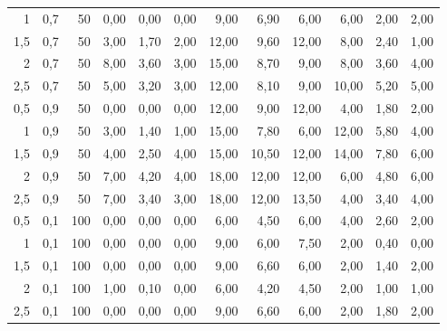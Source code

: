 \begin{table}[h]
\begin{tabular}{|r|r|r|r|r|r|r|r|r|r|r|r|}
1 & 0,7 & 50 & 0,00 & 0,00 & 0,00 & 9,00 & 6,90 & 6,00 & 6,00 & 2,00 & 2,00 \\
1,5 & 0,7 & 50 & 3,00 & 1,70 & 2,00 & 12,00 & 9,60 & 12,00 & 8,00 & 2,40 & 1,00 \\
2 & 0,7 & 50 & 8,00 & 3,60 & 3,00 & 15,00 & 8,70 & 9,00 & 8,00 & 3,60 & 4,00 \\
2,5 & 0,7 & 50 & 5,00 & 3,20 & 3,00 & 12,00 & 8,10 & 9,00 & 10,00 & 5,20 & 5,00 \\
0,5 & 0,9 & 50 & 0,00 & 0,00 & 0,00 & 12,00 & 9,00 & 12,00 & 4,00 & 1,80 & 2,00 \\
1 & 0,9 & 50 & 3,00 & 1,40 & 1,00 & 15,00 & 7,80 & 6,00 & 12,00 & 5,80 & 4,00 \\
1,5 & 0,9 & 50 & 4,00 & 2,50 & 4,00 & 15,00 & 10,50 & 12,00 & 14,00 & 7,80 & 6,00 \\
2 & 0,9 & 50 & 7,00 & 4,20 & 4,00 & 18,00 & 12,00 & 12,00 & 6,00 & 4,80 & 6,00 \\
2,5 & 0,9 & 50 & 7,00 & 3,40 & 3,00 & 18,00 & 12,00 & 13,50 & 4,00 & 3,40 & 4,00 \\
0,5 & 0,1 & 100 & 0,00 & 0,00 & 0,00 & 6,00 & 4,50 & 6,00 & 4,00 & 2,60 & 2,00 \\
1 & 0,1 & 100 & 0,00 & 0,00 & 0,00 & 9,00 & 6,00 & 7,50 & 2,00 & 0,40 & 0,00 \\
1,5 & 0,1 & 100 & 0,00 & 0,00 & 0,00 & 9,00 & 6,60 & 6,00 & 2,00 & 1,40 & 2,00 \\
2 & 0,1 & 100 & 1,00 & 0,10 & 0,00 & 6,00 & 4,20 & 4,50 & 2,00 & 1,00 & 1,00 \\
2,5 & 0,1 & 100 & 0,00 & 0,00 & 0,00 & 9,00 & 6,60 & 6,00 & 2,00 & 1,80 & 2,00 \\

\hline
\end{tabular}
\end{table}




